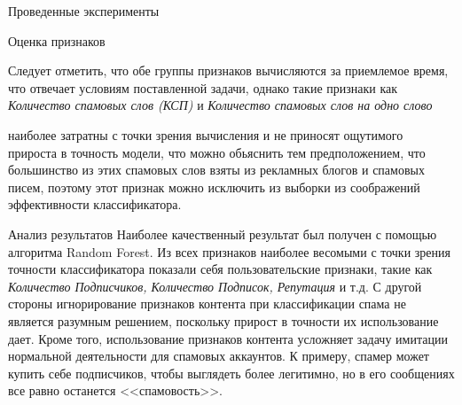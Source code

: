 \begin{section}{Проведенные эксперименты}
\begin{subsection}{Оценка признаков}
\begin{table}[H]
\caption{Время вычисления признаков}
\label{tab:comptime}
\end{table}

Следует отметить, что обе группы признаков вычисляются за приемлемое время, что отвечает условиям поставленной задачи, однако такие признаки как \textit{Количество спамовых слов (КСП)} и \textit{Количество спамовых слов на одно слово}
\end{subsection} наиболее затратны с точки зрения вычисления и не приносят ощутимого прироста в точность модели, что можно обьяснить тем предположением, что большинство из этих спамовых слов взяты из рекламных блогов и спамовых писем, поэтому этот признак можно исключить из выборки из соображений эффективности классификатора.


\begin{subsection}{Анализ результатов}
Наиболее качественный результат был получен с помощью алгоритма Random Forest. Из всех признаков наиболее весомыми с точки зрения точности классификатора показали себя пользовательские признаки, такие как \textit{Количество Подписчиков, Количество Подписок, Репутация} и т.д. С другой стороны игнорирование признаков контента при классификации спама не является разумным решением, поскольку прирост в точности их использование дает. Кроме того, использование признаков контента усложняет задачу имитации нормальной деятельности для спамовых аккаунтов. К примеру, спамер может купить себе подписчиков, чтобы выглядеть более легитимно, но в его сообщениях все равно останется <<спамовость>>.
\end{subsection}









\end{section}
